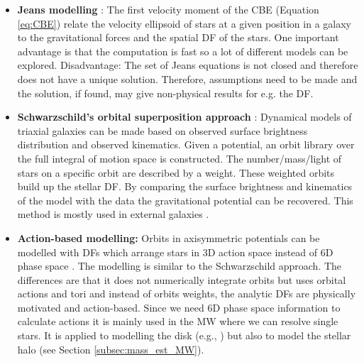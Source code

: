 \begin{itemize}
    \item \textbf{Jeans modelling} \citep{Jeans.....1915}: The first velocity moment of the \ac{CBE} (Equation \ref{eq:CBE}) relate the velocity ellipsoid of stars at a given position in a galaxy to the gravitational forces and the spatial \ac{DF} of the stars. One important advantage is that the computation is fast so a lot of different models can be explored. Disadvantage: The set of Jeans equations is not closed and therefore does not have a unique solution. Therefore, assumptions need to be made and the solution, if found, may give non-physical results for e.g. the \ac{DF}. 
    \item \textbf{Schwarzschild's orbital superposition approach} \citep{Schwarzschild...1979}: Dynamical models of triaxial galaxies can be made based on observed surface brightness distribution and observed kinematics. Given a potential, an orbit library over the full integral of motion space is constructed. The number/mass/light of stars on a specific orbit are described by a weight. These weighted orbits build up the stellar \ac{DF}. By comparing the surface brightness and kinematics of the model with the data the gravitational potential can be recovered. This method is mostly used in external galaxies \citep{Rix...Schwarzschild...1997, vdBosch...Schwarzschild...2008, Vasiliev...Schwarzschild...2013, Ling...Schwarzschild...2018}.
    \item \textbf{Action-based modelling:} Orbits in axisymmetric potentials can be modelled with \acp{DF} which arrange stars in 3D action space instead of 6D phase space \citep{Binney...actionbasedmodelling...2012, Bovy...actionbasedmodelling...2013}. The modelling is similar to the Schwarzschild approach. The differences are that it does not numerically integrate orbits but uses orbital actions and tori and instead of orbits weights, the analytic \acp{DF} are physically motivated and action-based. Since we need 6D phase space information to calculate actions it is mainly used in the \ac{MW} where we can resolve single stars. It is applied to modelling the disk (e.g., \citealp{trick...ROADMAPPING...2016, Wilmathesis}) but also to model the stellar halo (see Section \ref{subsec:mass_est_MW}). 
\end{itemize}
